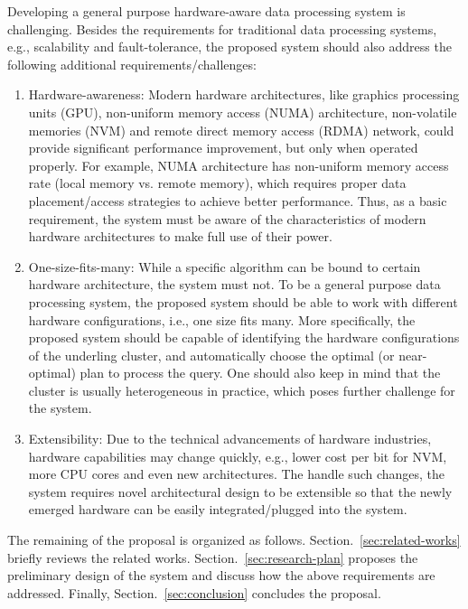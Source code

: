 \documentclass[conference]{llncs}
\newcommand{\refsection}[1]{Section.~\ref{#1}}
\begin{document}
Developing a general purpose hardware-aware data processing system is challenging.
Besides the requirements for traditional data processing systems, e.g., scalability and fault-tolerance, the proposed system should also address the following additional requirements/challenges:
\begin{enumerate}
\item Hardware-awareness: Modern hardware architectures, like graphics processing units (GPU), non-uniform memory access (NUMA) architecture, non-volatile memories (NVM) and remote direct memory access (RDMA) network, could provide significant performance improvement, but only when operated properly.
For example, NUMA architecture has non-uniform memory access rate (local memory vs. remote memory), which requires proper data placement/access strategies to achieve better performance.
Thus, as a basic requirement, the system must be aware of the characteristics of modern hardware architectures to make full use of their power.

\item One-size-fits-many: While a specific algorithm can be bound to certain hardware architecture, the system must not.
To be a general purpose data processing system, the proposed system should be able to work with different hardware configurations, i.e., one size fits many.
More specifically, the proposed system should be capable of identifying the hardware configurations of the underling cluster, and automatically choose the optimal (or near-optimal) plan to process the query.
One should also keep in mind that the cluster is usually heterogeneous in practice, which poses further challenge for the system.

\item Extensibility: Due to the technical advancements of hardware industries, hardware capabilities may change quickly, e.g., lower cost per bit for NVM, more CPU cores and even new architectures.
The handle such changes, the system requires novel architectural design to be extensible so that the newly emerged hardware can be easily integrated/plugged into the system.
\end{enumerate}

The remaining of the proposal is organized as follows. \refsection{sec:related-works} briefly reviews the related works.
\refsection{sec:research-plan} proposes the preliminary design of the system and discuss how the above requirements are addressed.
Finally, \refsection{sec:conclusion} concludes the proposal.
\end{document}
